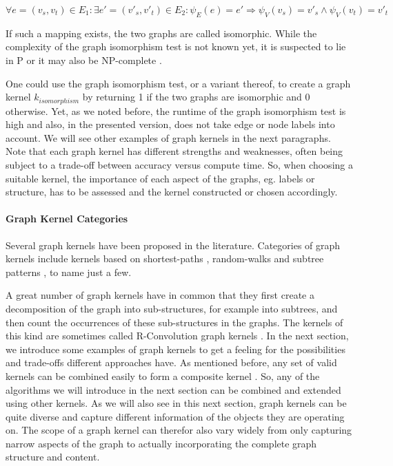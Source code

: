 \begin{equation*}
    \forall e = (v_s, v_t) \in E_1:
    \exists e' = (v'_s, v'_t) \in E_2:
    \psi_{E}(e) = e'
    \Rightarrow
    \psi_{V}(v_s) = v'_s
    \land
    \psi_{V}(v_t) = v'_t
\end{equation*}

If such a mapping exists, the two graphs are called isomorphic.
While the complexity of the graph isomorphism test is not known yet, it is suspected to lie in P or it may also be NP-complete \cite{Hido2009,Kulharia2008}.
 
One could use the graph isomorphism test, or a variant thereof, to create a graph kernel $k_{isomorphism}$ by returning 1 if the two graphs are isomorphic and 0 otherwise.
Yet, as we noted before, the runtime of the graph isomorphism test is high and also, in the presented version, does not take edge or node labels into account.
We will see other examples of graph kernels in the next paragraphs.
Note that each graph kernel has different strengths and weaknesses, often being subject to a trade-off between accuracy versus compute time.
So, when choosing a suitable kernel, the importance of each aspect of the graphs, eg. labels or structure, has to be assessed and the kernel constructed or chosen accordingly.

\paragraph{Graph Kernel Categories}
Several graph kernels have been proposed in the literature.
Categories of graph kernels include kernels based on shortest-paths \cite{Hermansson2015, Borgwardt2005, Nikolentzos2017b}, random-walks \cite{Neuhaus2006a} and subtree patterns \cite{Shervashidze2009,Douglas2011,Kersting2013}, to name just a few.

A great number of graph kernels have in common that they first create a decomposition of the graph into sub-structures, for example into subtrees, and then count the occurrences of these sub-structures in the graphs.
The kernels of this kind are sometimes called R-Convolution graph kernels \cite{Namomsa1965a}.
In the next section, we introduce some examples of graph kernels to get a feeling for the possibilities and trade-offs different approaches have.
As mentioned before, any set of valid kernels can be combined easily to form a composite kernel \cite[p.~296]{Bishop2006}.
So, any of the algorithms we will introduce in the next section can be combined and extended using other kernels.
As we will also see in this next section, graph kernels can be quite diverse and capture different information of the objects they are operating on.
The scope of a graph kernel can therefor also vary widely from only capturing narrow aspects of the graph to actually incorporating the complete graph structure and content.

